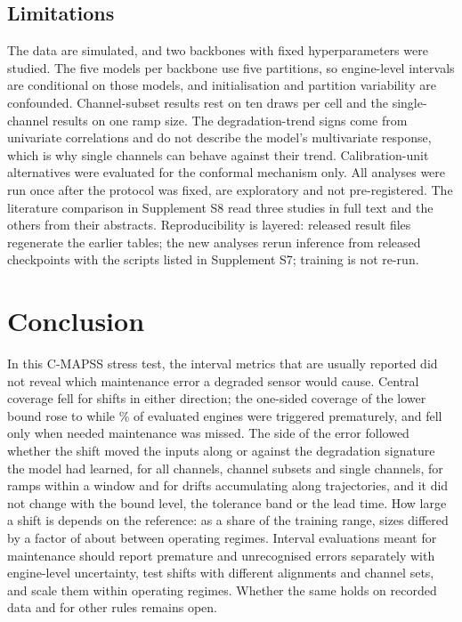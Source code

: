 \subsection{Limitations}
The data are simulated, and two backbones with fixed hyperparameters were studied. The five models per backbone use five partitions, so engine-level intervals are conditional on those models, and initialisation and partition variability are confounded. Channel-subset results rest on ten draws per cell and the single-channel results on one ramp size. The degradation-trend signs come from univariate correlations and do not describe the model's multivariate response, which is why single channels can behave against their trend. Calibration-unit alternatives were evaluated for the conformal mechanism only. All analyses were run once after the protocol was fixed, are exploratory and not pre-registered. The literature comparison in Supplement S8 read three studies in full text and the others from their abstracts. Reproducibility is layered: released result files regenerate the earlier tables; the new analyses rerun inference from released checkpoints with the scripts listed in Supplement S7; training is not re-run.

\section{Conclusion}
In this C-MAPSS stress test, the interval metrics that are usually reported did not reveal which maintenance error a degraded sensor would cause. Central coverage fell for shifts in either direction; the one-sided coverage of the lower bound rose to \RVCovTwo{} while \RVPremTwo\% of evaluated engines were triggered prematurely, and fell only when needed maintenance was missed. The side of the error followed whether the shift moved the inputs along or against the degradation signature the model had learned, for all channels, channel subsets and single channels, for ramps within a window and for drifts accumulating along trajectories, and it did not change with the bound level, the tolerance band or the lead time. How large a shift is depends on the reference: as a share of the training range, sizes differed by a factor of about \RVRatioFactor{} between operating regimes. Interval evaluations meant for maintenance should report premature and unrecognised errors separately with engine-level uncertainty, test shifts with different alignments and channel sets, and scale them within operating regimes. Whether the same holds on recorded data and for other rules remains open.

